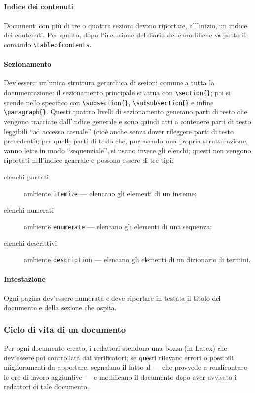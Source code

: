 \begin{itemize}
\paragraph{Indice dei contenuti} Documenti con più di tre o quattro sezioni devono riportare, all'inizio, un indice dei contenuti. Per questo, dopo l'inclusione del diario delle modifiche va posto il comando \texttt{\textbackslash tableofcontents}.
\paragraph{Sezionamento} Dev'esserci un'unica struttura gerarchica di sezioni comune a tutta la documentazione: il sezionamento principale si attua con \texttt{\textbackslash section\{\}}; poi si scende nello specifico con \texttt{\textbackslash subsection\{\}}, \texttt{\textbackslash subsubsection\{\}} e infine \texttt{\textbackslash paragraph\{\}}. Questi quattro livelli di sezionamento generano parti di testo che vengono tracciate dall'indice generale e sono quindi atti a contenere parti di testo leggibili “ad accesso casuale” (cioè anche senza dover rileggere parti di testo precedenti); per quelle parti di testo che, pur avendo una propria strutturazione, vanno lette in modo “sequenziale”, si usano invece gli elenchi; questi non vengono riportati nell'indice generale e possono essere di tre tipi:
\begin{description}
	\item[elenchi puntati] ambiente \texttt{itemize} --- elencano gli elementi di un insieme;
	\item[elenchi numerati] ambiente \texttt{enumerate} --- elencano gli elementi di una sequenza;
	\item[elenchi descrittivi] ambiente \texttt{description} --- elencano gli elementi di un dizionario di termini.
\end{description}
\paragraph{Intestazione} Ogni pagina dev'essere numerata e deve riportare in testata il titolo del documento e della sezione che ospita. %

\subsubsection{Ciclo di vita di un documento} Per ogni documento creato, i redattori stendono una bozza (in Latex) che dev'essere poi controllata dai verificatori; se questi rilevano errori o possibili miglioramenti da apportare, segnalano il fatto al  --- che provvede a rendicontare le ore di lavoro aggiuntive --- e modificano il documento dopo aver avvisato i redattori di tale documento.


\end{itemize}
